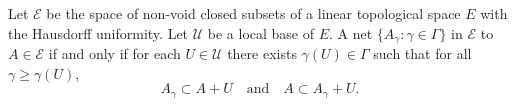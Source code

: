 Let $\mathcal{E}$ be the space of non-void closed subsets of a linear topological space $E$ with the Hausdorff uniformity. Let $\mathcal{U}$ be a local base of $E$. A net $\{A_\gamma: \gamma \in \Gamma\}$ in $\mathcal{E}$  to $A \in \mathcal{E}$ if and only if for each $U \in \mathcal{U}$ there exists $\gamma(U) \in \Gamma$ such that for all $\gamma \geq \gamma(U)$,
$$A_\gamma \subset A + U \quad \text{and} \quad A \subset A_\gamma + U.$$
